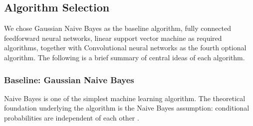\documentclass{acm_proc_article-sp}
\begin{document}
\subsection{Algorithm Selection}
We chose Gaussian Naive Bayes as the baseline algorithm, fully connected feedforward neural networks, linear support vector machine as required algorithms, together with Convolutional neural networks as the fourth optional algorithm. The following is a brief summary of central ideas of each algorithm.

\subsubsection{Baseline: Gaussian Naive Bayes}
Naive Bayes is one of the simplest machine learning algorithm. The theoretical foundation underlying the algorithm is the Naive Bayes assumption: conditional probabilities are independent of each other \cite{Bishop:2006:PRM:1162264, pineaul5}.
\end{document}
